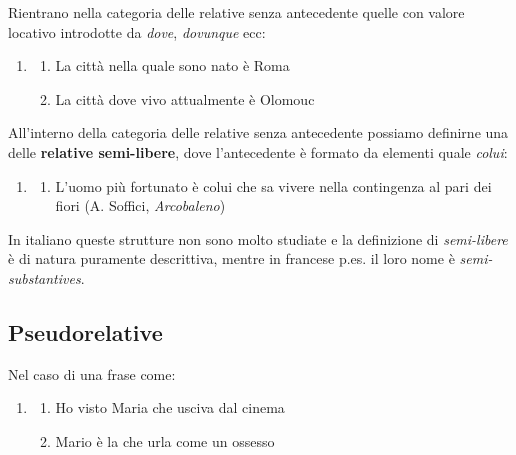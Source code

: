 \documentclass[
  a4paper,
  twoside,
  11pt,
  chapterprefix=false,
  bibliography=totocnumbered,
  listof=flat]{scrbook}
\providecommand{\tightlist}{%
  \setlength{\itemsep}{0pt}\setlength{\parskip}{0pt}}
\begin{document}
Rientrano nella categoria delle relative senza antecedente quelle con valore locativo introdotte da \emph{dove}, \emph{dovunque} ecc:

\begin{enumerate}
\def\labelenumi{(\arabic{enumi})}
\setcounter{enumi}{142}
\item
  \begin{enumerate}
  \def\labelenumii{\alph{enumii}.}
  \tightlist
  \item
    La città nella quale sono nato è Roma
  \item
    La città dove vivo attualmente è Olomouc
  \end{enumerate}
\end{enumerate}

All'interno della categoria delle relative senza antecedente possiamo definirne una delle \textbf{relative semi-libere}, dove l'antecedente è formato da elementi quale \emph{colui}:

\begin{enumerate}
\def\labelenumi{(\arabic{enumi})}
\setcounter{enumi}{143}
\item
  \begin{enumerate}
  \def\labelenumii{\alph{enumii}.}
  \tightlist
  \item
    L'uomo più fortunato è colui che sa vivere nella contingenza al pari dei fiori (A. Soffici, \emph{Arcobaleno})
  \end{enumerate}
\end{enumerate}

In italiano queste strutture non sono molto studiate e la definizione di \emph{semi-libere} è di natura puramente descrittiva, mentre in francese p.es. il loro nome è \emph{semi-substantives}.

\hypertarget{pseudorelative}{%
\subsection{Pseudorelative}\label{pseudorelative}}

Nel caso di una frase come:

\begin{enumerate}
\def\labelenumi{(\arabic{enumi})}
\setcounter{enumi}{144}
\item
  \begin{enumerate}
  \def\labelenumii{\alph{enumii}.}
  \tightlist
  \item
    Ho visto Maria che usciva dal cinema
  \item
    Mario è la che urla come un ossesso
  \end{enumerate}
\end{enumerate}
\end{document}
